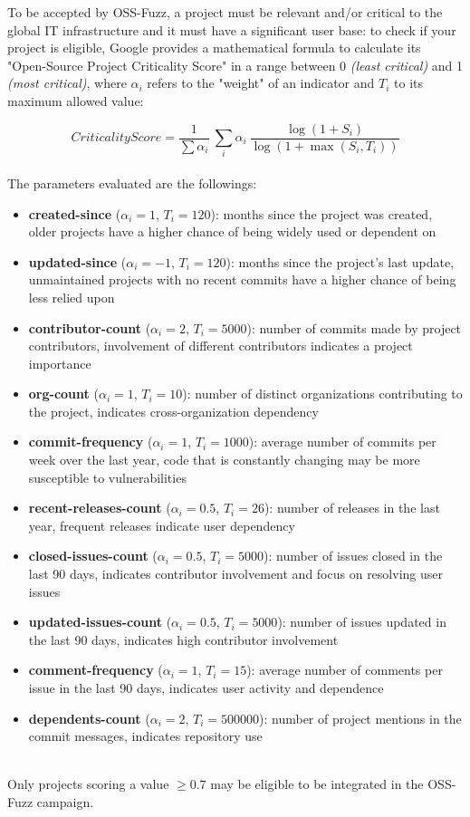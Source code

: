 \newpage
To be accepted by OSS-Fuzz, a project must be relevant and/or critical to the global IT infrastructure and it must have a significant user base: to check if your project is eligible, Google provides a mathematical formula to calculate its "Open-Source Project Criticality Score" \cite{score} in a range between 0 \textit{(least critical)} and 1 \textit{(most critical)}, where $\alpha_i$ refers to the "weight" of an indicator and $T_i$ to its maximum allowed value:

\begin{equation}
    CriticalityScore = \frac{1}{\sum \alpha_i}\  \sum_i \alpha_i \ \frac{\log(1+S_i)}{\log(1+\max(S_i,T_i))}
\end{equation}
\ \\
The parameters evaluated are the followings:
\begin{itemize}
    \item \textbf{created-since} ($\alpha_i = 1$, $T_i = 120$): months since the project was created, older projects have a higher chance of being widely used or dependent on
    \item \textbf{updated-since} ($\alpha_i = -1$, $T_i = 120$): months since the project's last update, unmaintained projects with no recent commits have a higher chance of being less relied upon
    \item \textbf{contributor-count} ($\alpha_i = 2$, $T_i = 5000$): number of commits made by project contributors, involvement of different contributors indicates a project importance
    \item \textbf{org-count} ($\alpha_i = 1$, $T_i = 10$): number of distinct organizations contributing to the project, indicates cross-organization dependency
    \item \textbf{commit-frequency} ($\alpha_i = 1$, $T_i = 1000$): average number of commits per week over the last year, code that is constantly changing may be more susceptible to vulnerabilities
    \item \textbf{recent-releases-count} ($\alpha_i = 0.5$, $T_i = 26$): number of releases in the last year, frequent releases indicate user dependency
    \item \textbf{closed-issues-count} ($\alpha_i = 0.5$, $T_i = 5000$): number of issues closed in the last 90 days, indicates contributor involvement and focus on resolving user issues
    \item \textbf{updated-issues-count} ($\alpha_i = 0.5$, $T_i = 5000$): number of issues updated in the last 90 days, indicates high contributor involvement
    \item \textbf{comment-frequency} ($\alpha_i = 1$, $T_i = 15$): average number of comments per issue in the last 90 days, indicates user activity and dependence
    \item \textbf{dependents-count} ($\alpha_i = 2$, $T_i = 500000$): number of project mentions in the commit messages, indicates repository use
\end{itemize}
\ \\
Only projects scoring a value $\geq 0.7$ may be eligible to be integrated in the OSS-Fuzz campaign.


